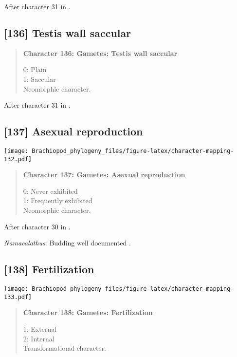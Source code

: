 \documentclass[openany]{book}
\theoremstyle{definition}
\theoremstyle{definition}
\theoremstyle{definition}
\theoremstyle{remark}
\begin{document}
After character 31 in \citet{Haszprunar1996}.

\subsection*{{[}136{]} Testis wall saccular}\label{testis-wall-saccular}

\begin{quote}
\textbf{Character 136: Gametes: Testis wall saccular}

0: Plain\\
1: Saccular\\
Neomorphic character.
\end{quote}

After character 31 in \citet{Haszprunar1996}.

\subsection*{{[}137{]} Asexual reproduction}\label{asexual-reproduction}

\texttt{[image: Brachiopod\_phylogeny\_files/figure-latex/character-mapping-132.pdf]}

\begin{quote}
\textbf{Character 137: Gametes: Asexual reproduction}

0: Never exhibited\\
1: Frequently exhibited\\
Neomorphic character.
\end{quote}

After character 30 in \citet{Haszprunar1996}.

\hypertarget{Namacalathus-coding-137}{}
\emph{Namacalathus}: Budding well documented
\citep[e.g.][]{Zhuravlev2015Ediacaranskeletal}.

\subsection*{{[}138{]} Fertilization}\label{fertilization}

\texttt{[image: Brachiopod\_phylogeny\_files/figure-latex/character-mapping-133.pdf]}

\begin{quote}
\textbf{Character 138: Gametes: Fertilization}

1: External\\
2: Internal\\
Transformational character.
\end{quote}
\end{document}

